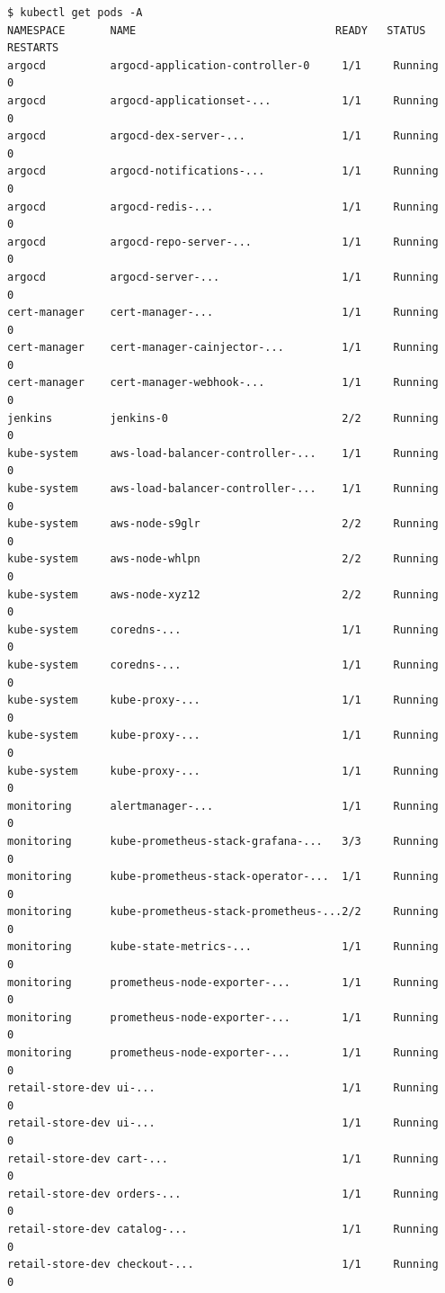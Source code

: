 \documentclass[13pt,a4paper,twoside]{extarticle}
\begin{document}
\begin{verbatim}
$ kubectl get pods -A
NAMESPACE       NAME                               READY   STATUS    RESTARTS
argocd          argocd-application-controller-0     1/1     Running   0
argocd          argocd-applicationset-...           1/1     Running   0
argocd          argocd-dex-server-...               1/1     Running   0
argocd          argocd-notifications-...            1/1     Running   0
argocd          argocd-redis-...                    1/1     Running   0
argocd          argocd-repo-server-...              1/1     Running   0
argocd          argocd-server-...                   1/1     Running   0
cert-manager    cert-manager-...                    1/1     Running   0
cert-manager    cert-manager-cainjector-...         1/1     Running   0
cert-manager    cert-manager-webhook-...            1/1     Running   0
jenkins         jenkins-0                           2/2     Running   0
kube-system     aws-load-balancer-controller-...    1/1     Running   0
kube-system     aws-load-balancer-controller-...    1/1     Running   0
kube-system     aws-node-s9glr                      2/2     Running   0
kube-system     aws-node-whlpn                      2/2     Running   0
kube-system     aws-node-xyz12                      2/2     Running   0
kube-system     coredns-...                         1/1     Running   0
kube-system     coredns-...                         1/1     Running   0
kube-system     kube-proxy-...                      1/1     Running   0
kube-system     kube-proxy-...                      1/1     Running   0
kube-system     kube-proxy-...                      1/1     Running   0
monitoring      alertmanager-...                    1/1     Running   0
monitoring      kube-prometheus-stack-grafana-...   3/3     Running   0
monitoring      kube-prometheus-stack-operator-...  1/1     Running   0
monitoring      kube-prometheus-stack-prometheus-...2/2     Running   0
monitoring      kube-state-metrics-...              1/1     Running   0
monitoring      prometheus-node-exporter-...        1/1     Running   0
monitoring      prometheus-node-exporter-...        1/1     Running   0
monitoring      prometheus-node-exporter-...        1/1     Running   0
retail-store-dev ui-...                             1/1     Running   0
retail-store-dev ui-...                             1/1     Running   0
retail-store-dev cart-...                           1/1     Running   0
retail-store-dev orders-...                         1/1     Running   0
retail-store-dev catalog-...                        1/1     Running   0
retail-store-dev checkout-...                       1/1     Running   0
\end{verbatim}
\end{document}
